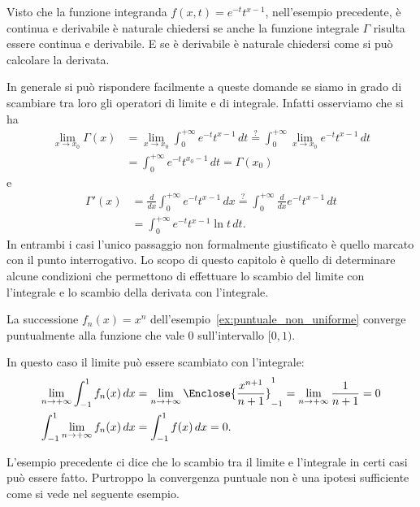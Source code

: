 Visto che la funzione integranda $f(x,t)=e^{-t}t^{x-1}$,
nell'esempio precedente,
è continua e derivabile
è naturale chiedersi se anche la funzione integrale $\Gamma$ 
risulta essere continua e derivabile. 
E se è derivabile è naturale chiedersi come si può calcolare
la derivata.

In generale si può rispondere facilmente a queste domande se siamo in grado di 
scambiare tra loro gli operatori di limite e di integrale. 
Infatti osserviamo che 
si ha 
\begin{align*}
  \lim_{x\to x_0} \Gamma(x) 
  &= \lim_{x\to x_0} \int_0^{+\infty} e^{-t}t^{x-1} \, dt 
  \stackrel{?}= \int_0^{+\infty} \lim_{x\to x_0} e^{-t}t^{x-1}\, dt\\
  &= \int_0^{+\infty} e^{-t}t^{x_0-1}\, dt
  = \Gamma(x_0)
\end{align*}
e 
\begin{align*}
  \Gamma'(x) 
  &= \frac{d}{dx} \int_0^{+\infty}e^{-t}t^{x-1}\, dx
  \stackrel{?}= \int_0^{+\infty} \frac{d}{dx}e^{-t}t^{x-1}\, dt \\
  &= \int_0^{+\infty} e^{-t}t^{x-1}\ln t\, dt.
\end{align*}
In entrambi i casi l'unico passaggio non formalmente giustificato è quello marcato
con il punto interrogativo. 
Lo scopo di questo capitolo è quello di determinare alcune condizioni che permettono 
di effettuare lo scambio del limite con l'integrale e lo scambio della derivata con l'integrale.


\begin{example}%
La successione $f_n(x)=x^n$ dell'esempio~\ref{ex:puntuale_non_uniforme}
converge puntualmente alla funzione che vale $0$ sull'intervallo $[0,1)$.

In questo caso il limite può essere scambiato con l'integrale:
\begin{align*}
\lim_{n\to +\infty} \int_{-1}^1 f_n(x)\, dx 
&= \lim_{n\to+\infty} \Enclose{\frac{x^{n+1}}{n+1}}_{-1}^1
 = \lim_{n\to+\infty} \frac{1}{n+1} = 0 \\
\int_{-1}^1 \lim_{n\to+\infty} f_n(x)\, dx 
&= \int_{-1}^1 f(x)\, dx = 0.
\end{align*}
\end{example}

L'esempio precedente ci dice che lo scambio tra il limite e l'integrale in certi casi 
può essere fatto. Purtroppo la convergenza puntuale non è una ipotesi sufficiente 
come si vede nel seguente esempio.

